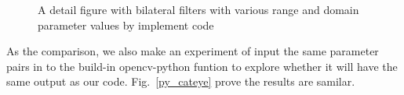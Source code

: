 \documentclass[12pt]{article}
\begin{document}
\begin{figure}[H]
  \quad
  \quad
  \quad
\caption{A detail figure with bilateral filters with various range and domain parameter values by implement code}
\label{im_cateye}
\end{figure}

As the comparison, we also make an experiment of input the same parameter pairs in to the build-in opencv-python funtion to explore whether it will have the same output as our code. Fig.~\ref{py_cateye} prove the results are samilar. 
\end{document}
